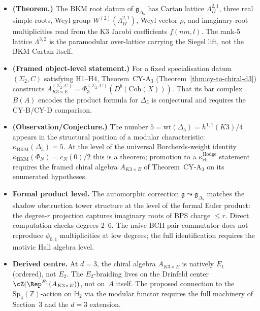 \begin{itemize}
\item \textbf{(Theorem.)} The BKM root datum of \(\mathfrak g_{\Delta_5}\)
has Cartan lattice \(\Lambda^{2,1}_{II}\), three real simple roots,
Weyl group \(W^{(2)}(\Lambda^{2,1}_{II})\), Weyl vector \(\rho\), and
imaginary-root multiplicities read from the K3 Jacobi coefficients
\(f(nm,l)\). The rank-$5$ lattice \(\Lambda^{3,2}\) is the paramodular
over-lattice carrying the Siegel lift, not the BKM Cartan itself.
 \item \textbf{(Framed object-level statement.)} For a fixed specialisation datum $(\Sigma_2,C)$ satisfying H1--H4, Theorem~CY-A$_3$ (Theorem~\ref{thm:cy-to-chiral-d3}) constructs $A_{K3 \times E}^{(\Sigma_2,C)}=\Phi_3^{(\Sigma_2,C)}(D^b(\mathrm{Coh}(X)))$. That its bar complex $B(A)$ encodes the product formula for $\Delta_5$ is conjectural and requires the CY-B/CY-D comparison.
 \item \textbf{(Observation/Conjecture.)} The number $5 = \mathrm{wt}(\Delta_5) = h^{1,1}(K3)/4$ appears in the structural position of a modular characteristic: $\kappa_{\mathrm{BKM}}(\Delta_5) = 5$. At the level of the universal Borcherds-weight identity $\kappa_{\mathrm{BKM}}(\Phi_N) = c_N(0)/2$ this is a theorem; promotion to a $\kappa_{\mathrm{ch}}^{\mathrm{Hodge}}$ statement requires the framed chiral algebra $A_{K3 \times E}$ of Theorem~CY-A$_3$ on its enumerated hypotheses.
 \item \textbf{Formal product level.} The automorphic correction $\mathfrak{g} \leadsto \mathfrak{g}_{\Delta_5}$ matches the shadow obstruction tower structure at the level of the formal Euler product: the degree-$r$ projection captures imaginary roots of BPS charge $\leq r$. Direct computation checks degrees 2--6. The naive BCH pair-commutator does not reproduce $\phi_{0,1}$ multiplicities at low degrees; the full identification requires the motivic Hall algebra level.
 \item \textbf{Derived centre.} At $d = 3$, the chiral algebra $A_{K3 \times E}$ is natively $E_1$ (ordered), not $E_2$. The $E_2$-braiding lives on the Drinfeld center $\cZ(\Rep^{E_1}(A_{K3 \times E}))$, not on~$A$ itself. The proposed connection to the $\mathrm{Sp}_4(\mathbb{Z})$-action on $\mathbb{H}_2$ via the modular functor requires the full machinery of Section~3 and the $d = 3$ extension.
\end{itemize}

